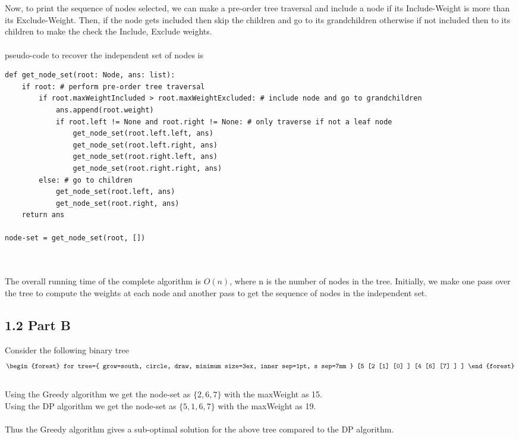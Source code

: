 \documentclass[12pt]{article}
\begin{document}
\\~\\
Now, to print the sequence of nodes selected, we can make a pre-order tree traversal and include a node if its Include-Weight is more than its Exclude-Weight. Then, if the node gets included then skip the children and go to its grandchildren otherwise if not included then to its children to make the check the Include, Exclude weights.
\\~\\
pseudo-code to recover the independent set of nodes is
\begin{verbatim}
def get_node_set(root: Node, ans: list):
    if root: # perform pre-order tree traversal
        if root.maxWeightIncluded > root.maxWeightExcluded: # include node and go to grandchildren
            ans.append(root.weight)
            if root.left != None and root.right != None: # only traverse if not a leaf node
                get_node_set(root.left.left, ans)
                get_node_set(root.left.right, ans)
                get_node_set(root.right.left, ans)
                get_node_set(root.right.right, ans)
        else: # go to children 
            get_node_set(root.left, ans)
            get_node_set(root.right, ans)
    return ans

node-set = get_node_set(root, [])
\end{verbatim} \\~\\
The overall running time of the complete algorithm is \(O(n)\), where n is the number of nodes in the tree. Initially, we make one pass over the tree to compute the weights at each node and another pass to get the sequence of nodes in the independent set.

\subsection*{1.2 Part B}
\vspace{10pt}
Consider the following binary tree \\
\begin{align*}
\begin{forest}
for tree={
    grow=south,
    circle, draw, minimum size=3ex, inner sep=1pt,
    s sep=7mm
        }
[5
    [2
        [1]
        [0]
    ]
    [4
        [6]
        [7]
    ]
]
\end{forest}
\end{align*}
\\
Using the Greedy algorithm we get the node-set as \(\{2,6,7\}\) with the maxWeight as 15. \\
Using the DP algorithm we get the node-set as \(\{5,1,6,7\}\) with the maxWeight as 19. \\~\\
Thus the Greedy algorithm gives a sub-optimal solution for the above tree compared to the DP algorithm.
\end{document}
